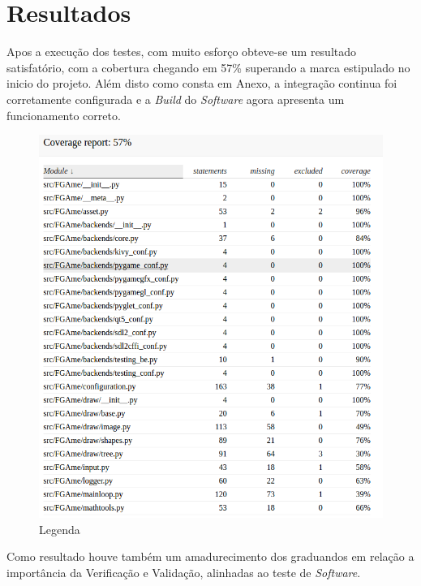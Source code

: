 \chapter{Resultados}

Apos a execução dos testes, com muito esforço obteve-se um resultado satisfatório, com a cobertura chegando em 57\% superando a marca estipulado no inicio do projeto. Além disto como consta em Anexo, a integração continua foi corretamente configurada e a \textit{Build} do \textit{Software} agora apresenta um funcionamento correto.

\begin{figure}[!htb]
\centering
\includegraphics[scale=0.6]{figuras/coverage}
\caption{Legenda}
\label{Rotulo}
\end{figure}

Como resultado houve também um amadurecimento dos graduandos em relação a importância da Verificação e Validação, alinhadas ao teste de \textit{Software}.